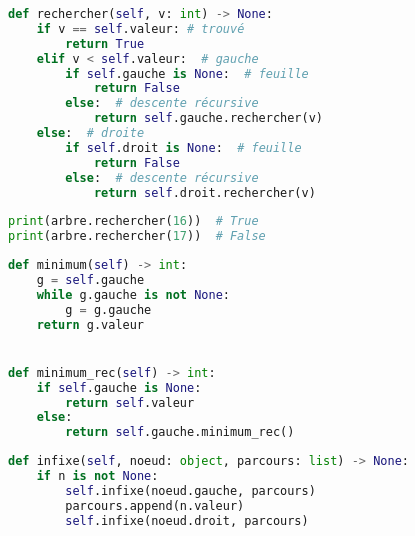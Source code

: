\documentclass[svgnames,11pt]{beamer}
\begin{document}
\begin{frame}[fragile]

\begin{center}
\begin{lstlisting}[language=Python , basicstyle=\ttfamily\small, xleftmargin=0.5em, xrightmargin=0em]
def rechercher(self, v: int) -> None:
    if v == self.valeur: # trouvé
        return True
    elif v < self.valeur:  # gauche
        if self.gauche is None:  # feuille
            return False
        else:  # descente récursive
            return self.gauche.rechercher(v)
    else:  # droite
        if self.droit is None:  # feuille
            return False
        else:  # descente récursive
            return self.droit.rechercher(v)
\end{lstlisting}
\end{center}

\end{frame}
\begin{frame}[fragile]

\begin{center}
\begin{lstlisting}[language=Python , basicstyle=\ttfamily\small, xleftmargin=0.5em, xrightmargin=0em]
print(arbre.rechercher(16))  # True
print(arbre.rechercher(17))  # False
\end{lstlisting}
\end{center}
    
    \end{frame}
\begin{frame}[fragile]

\begin{center}
\begin{lstlisting}[language=Python , basicstyle=\ttfamily\small, xleftmargin=0.5em, xrightmargin=0em]
def minimum(self) -> int:
    g = self.gauche
    while g.gauche is not None:
        g = g.gauche
    return g.valeur


def minimum_rec(self) -> int:
    if self.gauche is None:
        return self.valeur
    else:
        return self.gauche.minimum_rec()
\end{lstlisting}
\end{center}

\end{frame}
\begin{frame}[fragile]

\begin{center}
\begin{lstlisting}[language=Python , basicstyle=\ttfamily\small, xleftmargin=0.5em, xrightmargin=-2.5em]
def infixe(self, noeud: object, parcours: list) -> None:
    if n is not None:
        self.infixe(noeud.gauche, parcours)
        parcours.append(n.valeur)
        self.infixe(noeud.droit, parcours)
\end{lstlisting}
\end{center}
    
    \end{frame}
\end{document}
